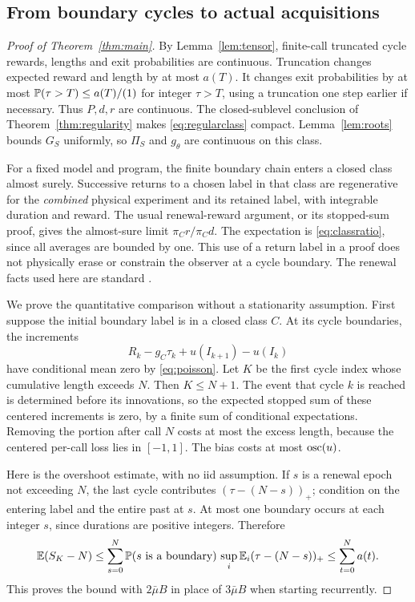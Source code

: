 \subsection{From boundary cycles to actual acquisitions}
\begin{proof}[Proof of Theorem~\ref{thm:main}]
By Lemma~\ref{lem:tensor}, finite-call truncated cycle rewards, lengths and exit probabilities are continuous. Truncation changes expected reward and length by at most $a(T)$. It changes exit probabilities by at most $\mathbb P(\tau>T)\le a(T)/(1)$ for integer $\tau>T$, using a truncation one step earlier if necessary. Thus $P,d,r$ are continuous. The closed-sublevel conclusion of Theorem~\ref{thm:regularity} makes \eqref{eq:regularclass} compact. Lemma~\ref{lem:roots} bounds $G_S$ uniformly, so $\Pi_S$ and $g_\theta$ are continuous on this class.

For a fixed model and program, the finite boundary chain enters a closed class almost surely. Successive returns to a chosen label in that class are regenerative for the \emph{combined} physical experiment and its retained label, with integrable duration and reward. The usual renewal-reward argument, or its stopped-sum proof, gives the almost-sure limit $\pi_C r/\pi_Cd$. The expectation is \eqref{eq:classratio}, since all averages are bounded by one. This use of a return label in a proof does not physically erase or constrain the observer at a cycle boundary. The renewal facts used here are standard \cite{Asmussen}.

We prove the quantitative comparison without a stationarity assumption. First suppose the initial boundary label is in a closed class $C$. At its cycle boundaries, the increments
\[
 R_k-g_C\tau_k+u(I_{k+1})-u(I_k)
\]
have conditional mean zero by \eqref{eq:poisson}. Let $K$ be the first cycle index whose cumulative length exceeds $N$. Then $K\le N+1$. The event that cycle $k$ is reached is determined before its innovations, so the expected stopped sum of these centered increments is zero, by a finite sum of conditional expectations. Removing the portion after call $N$ costs at most the excess length, because the centered per-call loss lies in $[-1,1]$. The bias costs at most $\operatorname{osc}(u)$.

Here is the overshoot estimate, with no iid assumption. If $s$ is a renewal epoch not exceeding $N$, the last cycle contributes $(\tau-(N-s))_+$; condition on the entering label and the entire past at $s$. At most one boundary occurs at each integer $s$, since durations are positive integers. Therefore
\begin{equation}\label{eq:overshoot}
 \mathbb E(S_K-N)
 \le\sum_{s=0}^N\mathbb P(s\text{ is a boundary})\,
       \sup_i\mathbb E_i(\tau-(N-s))_+
 \le\sum_{t=0}^N a(t).
\end{equation}
This proves the bound with $2\bar\mu B$ in place of $3\bar\mu B$ when starting recurrently.


\end{proof}
